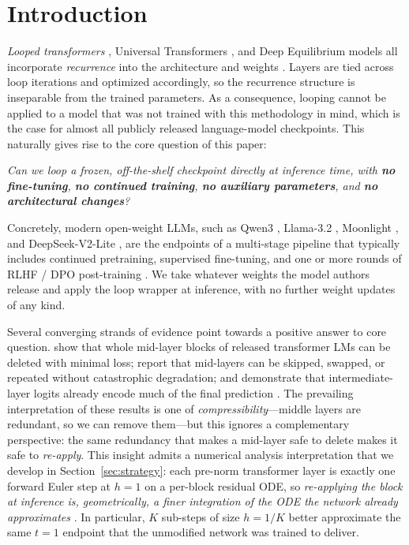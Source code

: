 \section{Introduction}
\label{sec:intro}

\emph{Looped transformers} \citep{liu2024looped, yang2025looped}, Universal Transformers \citep{dehghani2019universal,lan2020albert}, and Deep Equilibrium models \citep{bai2019deep,bai2020multiscale} all incorporate \emph{recurrence} into the architecture \citep{xu2025expressive,saunshi2025reasoning,merrill2025little,gong2025whatmakes} and weights \citep{geiping2025scaling,zhu2025ouro,prairie2026parcae,wu2025parallel}. Layers are tied across loop iterations and optimized accordingly, so the recurrence structure is inseparable from the trained parameters. As a consequence, looping cannot be applied to a model that was not trained with this methodology in mind, which is the case for almost all publicly released language-model checkpoints. This naturally gives rise to the core question of this paper:

\smallskip
\begin{tcolorbox}[ourqbox]
\itshape
Can we loop a frozen, off-the-shelf checkpoint directly at inference time, with \textbf{no fine-tuning}, \textbf{no continued training}, \textbf{no auxiliary parameters}, and \textbf{no architectural changes}?
\end{tcolorbox}
\smallskip

Concretely, modern open-weight LLMs, such as Qwen3 \citep{qwen3}, Llama-3.2 \citep{llama3}, Moonlight \citep{moonlight}, and DeepSeek-V2-Lite \citep{deepseekv2}, are the endpoints of a multi-stage pipeline that typically includes continued pretraining, supervised fine-tuning, and one or more rounds of RLHF / DPO post-training \citep{deepseek2025r1}. We take whatever weights the model authors release and apply the loop wrapper at inference, with no further weight updates of any kind.

Several converging strands of evidence point towards a positive answer to core question. \cite{men2024short} show that whole mid-layer blocks of released transformer LMs can be deleted with minimal loss; \cite{lad2024remarkable} report that mid-layers can be skipped, swapped, or repeated without catastrophic degradation; and \cite{belrose2023eliciting} demonstrate that intermediate-layer logits already encode much of the final prediction \citep{takase2021lessons,reid2021subformer}. The prevailing interpretation of these results is one of \emph{compressibility}---middle layers are redundant, so we can remove them---but this ignores a complementary perspective: the same redundancy that makes a mid-layer safe to delete makes it safe to \emph{re-apply}. This insight admits a numerical analysis interpretation that we develop in Section~\ref{sec:strategy}: each pre-norm transformer layer is exactly one forward Euler step at $h{=}1$ on a per-block residual ODE, so \emph{re-applying the block at inference is, geometrically, a finer integration of the ODE the network already approximates} \citep{bai2019deep,bai2020multiscale}. In particular, $K$ sub-steps of size $h{=}1/K$ better approximate the same $t{=}1$ endpoint that the unmodified network was trained to deliver.

